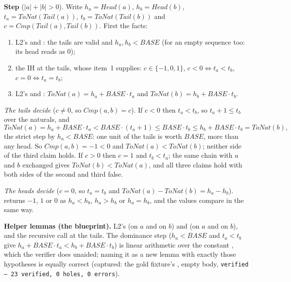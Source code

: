 \documentclass[11pt]{article}
\begin{document}
\textbf{Step} ($|a| + |b| > 0$). Write $h_a = \mathit{Head}(a)$,
$h_b = \mathit{Head}(b)$, $t_a = \mathit{ToNat}(\mathit{Tail}(a))$,
$t_b = \mathit{ToNat}(\mathit{Tail}(b))$ and
$c = \mathit{Cmp}(\mathit{Tail}(a), \mathit{Tail}(b))$. First the facts:
\begin{enumerate}
\item L2's  and : the tails are valid and
  $h_a, h_b < \mathit{BASE}$ (for an empty sequence too: its head reads as 0);
\item the IH at the tails, whose  item~1 supplies:
  $c \in \{-1, 0, 1\}$, $c < 0 \iff t_a < t_b$, $c = 0 \iff t_a = t_b$;
\item L2's  and :
  $\mathit{ToNat}(a) = h_a + \mathit{BASE} \cdot t_a$ and
  $\mathit{ToNat}(b) = h_b + \mathit{BASE} \cdot t_b$.
\end{enumerate}
\emph{The tails decide} ($c \neq 0$, so $\mathit{Cmp}(a, b) = c$). If $c < 0$
then $t_a < t_b$, so $t_a + 1 \leq t_b$ over the naturals, and
\[
  \mathit{ToNat}(a) = h_a + \mathit{BASE} \cdot t_a
  < \mathit{BASE} \cdot (t_a + 1) \leq \mathit{BASE} \cdot t_b
  \leq h_b + \mathit{BASE} \cdot t_b = \mathit{ToNat}(b),
\]
the strict step by $h_a < \mathit{BASE}$: one unit of the tails is worth
$\mathit{BASE}$, more than any head. So $\mathit{Cmp}(a, b) = -1 < 0$ and
$\mathit{ToNat}(a) < \mathit{ToNat}(b)$; neither side of the third claim
holds. If $c > 0$ then $c = 1$ and $t_b < t_a$; the same chain with $a$ and
$b$ exchanged gives $\mathit{ToNat}(b) < \mathit{ToNat}(a)$, and all three
claims hold with both sides of the second and third false.

\emph{The heads decide} ($c = 0$, so $t_a = t_b$ and
$\mathit{ToNat}(a) - \mathit{ToNat}(b) = h_a - h_b$).  returns $-1$,
$1$ or $0$ as $h_a < h_b$, $h_a > h_b$ or $h_a = h_b$, and the values compare
in the same way.

\textbf{Helper lemmas (the blueprint).} L2's  (on $a$ and on
$b$) and  (on $a$ and on $b$), and the recursive call at the
tails. The dominance step ($h_a < \mathit{BASE}$ and $t_a < t_b$ give
$h_a + \mathit{BASE} \cdot t_a < h_b + \mathit{BASE} \cdot t_b$) is linear
arithmetic over the constant , which the verifier does unaided;
naming it as a new lemma with exactly those hypotheses is equally correct
(captured: the gold fixture's , empty body,
\texttt{verified --- 23 verified, 0 holes, 0 errors}).
\end{document}
